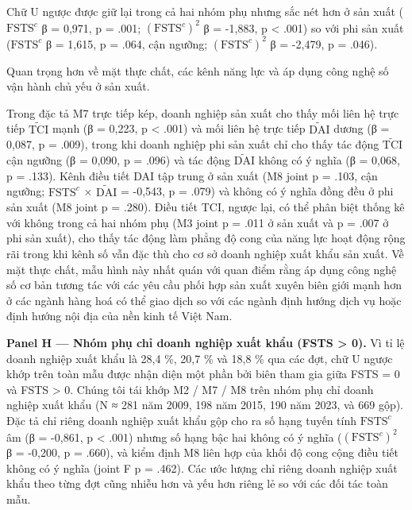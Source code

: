 \documentclass[12pt,a4paper]{article}
\begin{document}
Chữ U ngược được giữ lại trong cả hai nhóm phụ nhưng sắc nét hơn ở sản
xuất (\(\mathrm{FSTS}^{c}\) β = 0,971, p = .001;
\((\mathrm{FSTS}^{c})^2\) β = -1,883, p \textless{} .001) so với phi sản
xuất (\(\mathrm{FSTS}^{c}\) β = 1,615, p = .064, cận ngưỡng;
\((\mathrm{FSTS}^{c})^2\) β = -2,479, p = .046).

Quan trọng hơn về mặt thực chất, các kênh năng lực và áp dụng công nghệ
số vận hành chủ yếu ở sản xuất.

Trong đặc tả M7 trực tiếp kép, doanh nghiệp sản xuất cho thấy mối liên
hệ trực tiếp \(\tilde{\mathrm{TCI}}\) mạnh (β = 0,223, p \textless{}
.001) và mối liên hệ trực tiếp \(\tilde{\mathrm{DAI}}\) dương (β =
0,087, p = .009), trong khi doanh nghiệp phi sản xuất chỉ cho thấy tác
động \(\tilde{\mathrm{TCI}}\) cận ngưỡng (β = 0,090, p = .096) và tác
động \(\tilde{\mathrm{DAI}}\) không có ý nghĩa (β = 0,068, p = .133).
Kênh điều tiết DAI tập trung ở sản xuất (M8 joint p = .103, cận ngưỡng;
\(\mathrm{FSTS}^{c}\) × \(\tilde{\mathrm{DAI}}\) = -0,543, p = .079) và
không có ý nghĩa đồng đều ở phi sản xuất (M8 joint p = .280). Điều tiết
TCI, ngược lại, có thể phân biệt thống kê với không trong cả hai nhóm
phụ (M3 joint p = .011 ở sản xuất và p = .007 ở phi sản xuất), cho thấy
tác động làm phẳng độ cong của năng lực hoạt động rộng rãi trong khi
kênh số vẫn đặc thù cho cơ sở doanh nghiệp xuất khẩu sản xuất. Về mặt
thực chất, mẫu hình này nhất quán với quan điểm rằng áp dụng công nghệ
số cơ bản tương tác với các yêu cầu phối hợp sản xuất xuyên biên giới
mạnh hơn ở các ngành hàng hoá có thể giao dịch so với các ngành định
hướng dịch vụ hoặc định hướng nội địa của nền kinh tế Việt Nam.

\textbf{Panel H --- Nhóm phụ chỉ doanh nghiệp xuất khẩu (FSTS
\textgreater{} 0).} Vì tỉ lệ doanh nghiệp xuất khẩu là 28,4 \%, 20,7 \%
và 18,8 \% qua các đợt, chữ U ngược khớp trên toàn mẫu được nhận diện
một phần bởi biên tham gia giữa FSTS = 0 và FSTS \textgreater{} 0. Chúng
tôi tái khớp M2 / M7 / M8 trên nhóm phụ chỉ doanh nghiệp xuất khẩu (N ≈
281 năm 2009, 198 năm 2015, 190 năm 2023, và 669 gộp). Đặc tả chỉ riêng
doanh nghiệp xuất khẩu gộp cho ra số hạng tuyến tính
\(\mathrm{FSTS}^{c}\) âm (β = -0,861, p \textless{} .001) nhưng số hạng
bậc hai không có ý nghĩa (\((\mathrm{FSTS}^{c})^2\) β = -0,200, p =
.660), và kiểm định M8 liên hợp của khối độ cong cộng điều tiết không có
ý nghĩa (joint F p = .462). Các ước lượng chỉ riêng doanh nghiệp xuất
khẩu theo từng đợt cũng nhiễu hơn và yếu hơn riêng lẻ so với các đối tác
toàn mẫu.
\end{document}
